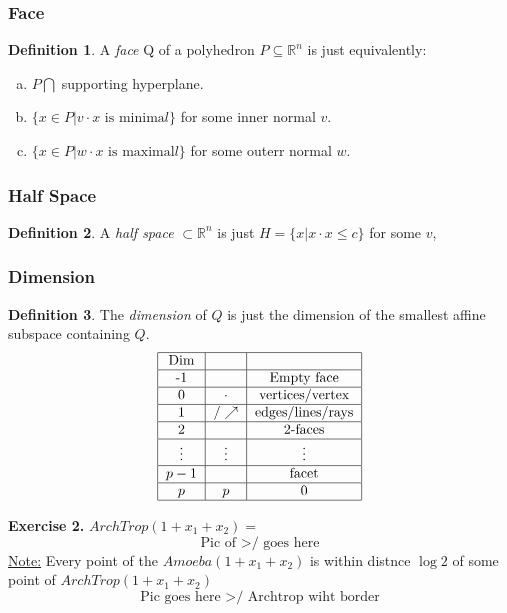 \documentclass[]{article}
\theoremstyle{definition}
\newtheorem*{defn}{Definition}
\begin{document}
			\subsubsection{Face}
			\begin{defn}
			A \emph{face} Q of a polyhedron $P \subseteq \mathbb{R}^n$ is just equivalently:
			\begin{enumerate}[(a)]
			\item $P \bigcap $ supporting hyperplane.
			\item $\{x \in P | v\cdot x \text{ is minima}l\}$ for some inner normal $v$. 
			\item $\{x \in P | w\cdot x \text{ is maximal}l\}$ for some outerr normal $w$.
			\end{enumerate}
			\end{defn}
			\subsubsection{Half Space}
			\begin{defn}
			A \emph{half space} $\subset\mathbb{R}^n$ is just
			$H=\{x | x\cdot x \leq c\}$
			for some $v$,
			\end{defn}
			\subsubsection{Dimension}
			\begin{defn}
			The \emph{dimension} of $Q$ is just the dimension of the smallest affine subspace containing $Q$.
			\[
			\begin{tabular}{|c|c|c|}\hline Dim &  &  \\\hline -1 & $\empty$ & Empty face \\\hline 0 & $\cdot$ & vertices/vertex \\\hline 1 & $ / \nearrow$  & edges/lines/rays \\\hline 2 & \makebox{\quad } & 2-faces \\\hline $\vdots$ & $\vdots$ & $\vdots$ \\\hline $p-1$ &  & facet \\\hline $p$ & $p$& 0 \\\hline \end{tabular}\]
			\end{defn}
			\textbf{Exercise 2.}
			$ArchTrop(1+x_1+x_2)=$
			\[ \text{Pic of >/  goes here} \]
			\underline{Note:} Every point of the $Amoeba(1+x_1+x_2)$ is within distnce $\log2$ of some point of $ArchTrop(1+x_1+x_2)$
			\[\text{Pic goes here >/ Archtrop wiht border}\]
			

			

%
%
%
%
%
%
%
%
%
%
%
%
%
%
%			
\end{document}
